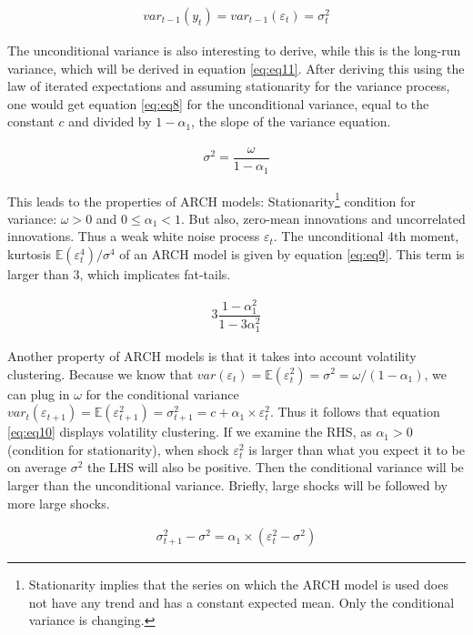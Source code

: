 \documentclass[a4paper, twoside]{templates/ociamthesis}
\begin{document}
\begin{align} 
var_{t-1}(y_t) = var_{t-1}(\varepsilon_t)= \sigma_t^2
 \label{eq:eq7}
\end{align}

\noindent The unconditional variance is also interesting to derive, while this is the long-run variance, which will be derived in equation \eqref{eq:eq11}. After deriving this using the law of iterated expectations and assuming stationarity for the variance process, one would get equation \eqref{eq:eq8} for the unconditional variance, equal to the constant \(c\) and divided by \(1-\alpha_1\), the slope of the variance equation.

\begin{align} 
\sigma^2 = \dfrac{\omega}{1-\alpha_1}
 \label{eq:eq8}
\end{align}

\noindent This leads to the properties of ARCH models: Stationarity\footnote{Stationarity implies that the series on which the ARCH model is used does not have any trend and has a constant expected mean. Only the conditional variance is changing.} condition for variance: \(\omega>0\) and \(0 \le \alpha_1 < 1\). But also, zero-mean innovations and uncorrelated innovations. Thus a weak white noise process \(\varepsilon_t\). The unconditional 4th moment, kurtosis \(\mathbb{E}(\varepsilon_t^4)/\sigma^4\) of an ARCH model is given by equation \eqref{eq:eq9}. This term is larger than 3, which implicates fat-tails.

\begin{align} 
3\dfrac{1-\alpha_1^2}{1-3\alpha_1^2}
 \label{eq:eq9}
\end{align}

\noindent Another property of ARCH models is that it takes into account volatility clustering. Because we know that \(var(\varepsilon_t) = \mathbb{E}(\varepsilon_t^2) = \sigma^2 = \omega/(1-\alpha_1)\), we can plug in \(\omega\) for the conditional variance \(var_t(\varepsilon_{t+1}) = \mathbb{E}(\varepsilon_{t+1}^2) = \sigma_{t+1}^2 = c + \alpha_1\times\varepsilon_t^2\). Thus it follows that equation \eqref{eq:eq10} displays volatility clustering. If we examine the RHS, as \(\alpha_1>0\) (condition for stationarity), when shock \(\varepsilon_t^2\) is larger than what you expect it to be on average \(\sigma^2\) the LHS will also be positive. Then the conditional variance will be larger than the unconditional variance. Briefly, large shocks will be followed by more large shocks.

\begin{align} 
\sigma_{t+1}^2 - \sigma^2 = \alpha_1\times(\varepsilon_t^2 - \sigma^2)
 \label{eq:eq10}
\end{align}
\end{document}
